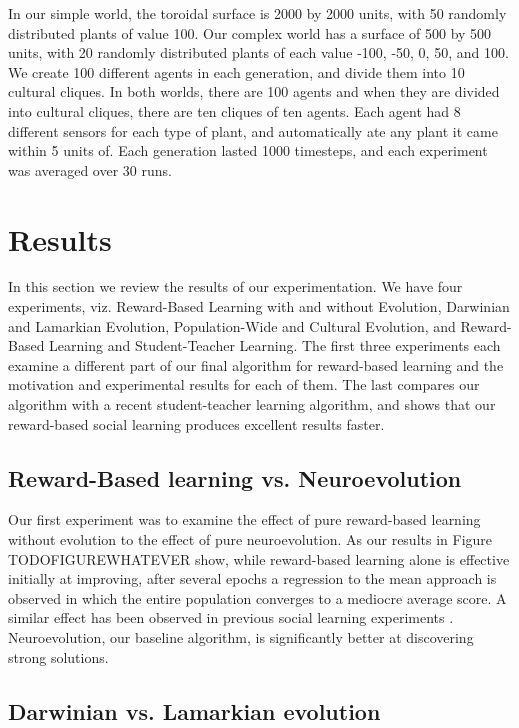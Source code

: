 \documentclass{acm_proc_article-sp}
\begin{document}
In our simple world, the toroidal surface is 2000 by 2000 units, with 50 randomly distributed plants of value 100. Our complex world has a surface of 500 by 500 units, with 20 randomly distributed plants of each value -100, -50, 0, 50, and 100. We create 100 different agents in each generation,  and divide them into 10 cultural cliques. In both worlds, there are 100 agents and when they are divided into cultural cliques, there are ten cliques of ten agents. Each agent had 8 different sensors for each type of plant, and automatically ate any plant it came within 5 units of. Each generation lasted 1000 timesteps, and each experiment was averaged over 30 runs.

\section{Results}
\label{sec:results}
In this section we review the results of our experimentation.  We have four experiments, viz. Reward-Based Learning with and without Evolution, Darwinian and Lamarkian Evolution, Population-Wide and Cultural Evolution, and Reward-Based Learning and Student-Teacher Learning.   The first three experiments each examine a different part of our final algorithm for reward-based learning and the motivation and experimental results for each of them.  The last compares our algorithm with a recent student-teacher learning algorithm, and shows that our reward-based social learning produces excellent results faster.

\subsection*{Reward-Based learning vs. Neuroevolution}

Our first experiment was to examine the effect of pure reward-based learning without evolution to the effect of pure neuroevolution.  As our results in Figure TODOFIGUREWHATEVER show, while reward-based learning alone is effective initially at improving, after several epochs a regression to the mean approach is observed in which the entire population converges to a mediocre average score. A similar effect has been observed in previous social learning experiments \cite{denaro1996cultural}.   Neuroevolution, our baseline algorithm, is significantly better at discovering strong solutions. 

\subsection*{Darwinian vs. Lamarkian evolution}
\end{document}
